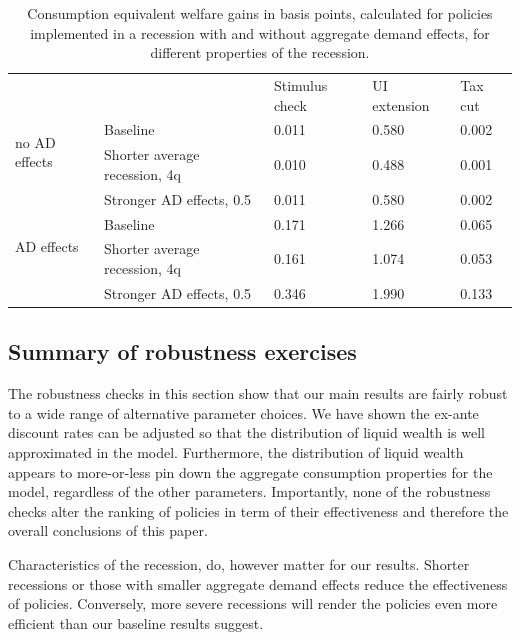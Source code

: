 \documentclass[../HAFiscal]{subfiles}
\begin{document}
\begin{table}[]
	\begin{center}
		\begin{tabular}{@{}lllll@{}}
			\toprule
			&                    											& Stimulus check & UI extension & Tax cut 	\\ \cmidrule(l){1-5}
			\multirow{2}{*}{no AD effects} 					& Baseline 						& 0.011          & 0.580        & 0.002   	\\ 
			& Shorter average recession, 4q & 0.010          & 0.488        & 0.001  	\\
			& Stronger AD effects, 0.5 		& 0.011          & 0.580        & 0.002   	\\ \cmidrule(l){1-5}
			\multirow{2}{*}{AD effects}						& Baseline    					& 0.171          & 1.266        & 0.065   	\\
			& Shorter average recession, 4q & 0.161          & 1.074        & 0.053   	\\
			& Stronger AD effects, 0.5    	& 0.346          & 1.990        & 0.133   	\\ \cmidrule(l){1-5} 
		\end{tabular}
		\caption{Consumption equivalent welfare gains in basis points, calculated for policies implemented in a recession with and without aggregate demand effects, for different properties of the recession.}
		\label{tab:robustness_recession_property_results}
	\end{center}
\end{table}




\FloatBarrier
\subsection{Summary of robustness exercises}
\label{sec:robust_summary}

The robustness checks in this section show that our main results are fairly robust to a wide range of alternative parameter choices. We have shown the ex-ante discount rates can be adjusted so that the distribution of liquid wealth is well approximated in the model.  Furthermore, the distribution of liquid wealth appears to more-or-less pin down the aggregate consumption properties for the model, regardless of the other parameters. Importantly, none of the robustness checks alter the ranking of policies in term of their effectiveness and therefore the overall conclusions of this paper.

Characteristics of the recession, do, however matter for our results. Shorter recessions or those with smaller aggregate demand effects reduce the effectiveness of policies. Conversely, more severe recessions will render the policies even more efficient than our baseline results suggest.
\end{document}
